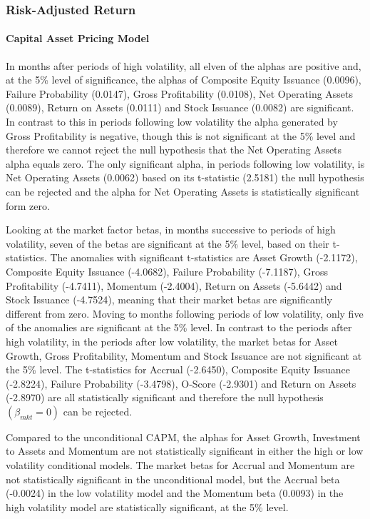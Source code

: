 \documentclass[a4paper]{article}                 %
\begin{document}
\subsubsection{Risk-Adjusted Return}
\paragraph{Capital Asset Pricing Model}
In months after periods of high volatility, all elven of the alphas are positive and, at the 5\% level of significance, the alphas of Composite Equity Issuance (0.0096), Failure Probability (0.0147), Gross Profitability (0.0108), Net Operating Assets (0.0089), Return on Assets (0.0111) and Stock Issuance (0.0082) are significant. In contrast to this in periods following low volatility the alpha generated by Gross Profitability is negative, though this is not significant at the 5\% level and therefore we cannot reject the null hypothesis that the Net Operating Assets alpha equals zero. The only significant alpha, in periods following low volatility, is Net Operating Assets (0.0062) based on its t-statistic (2.5181) the null hypothesis can be rejected and the alpha for Net Operating Assets is statistically significant form zero. 

Looking at the market factor betas, in months successive to periods of high volatility, seven of the betas are significant at the 5\% level, based on their t-statistics. The anomalies with significant t-statistics are Asset Growth (-2.1172), Composite Equity Issuance (-4.0682), Failure Probability (-7.1187), Gross Profitability (-4.7411), Momentum (-2.4004), Return on Assets (-5.6442) and Stock Issuance (-4.7524), meaning that their market betas are significantly different from zero. Moving to months following periods of low volatility, only five of the anomalies are significant at the 5\% level. In contrast to the periods after high volatility, in the periods after low volatility, the market betas for Asset Growth, Gross Profitability, Momentum and Stock Issuance are not significant at the 5\% level. The t-statistics for Accrual (-2.6450), Composite Equity Issuance (-2.8224), Failure Probability (-3.4798), O-Score (-2.9301) and Return on Assets (-2.8970) are all statistically significant and therefore the null hypothesis $(\beta_{mkt}= 0)$ can be rejected.

Compared to the unconditional CAPM, the alphas for Asset Growth, Investment to Assets and Momentum are not statistically significant in either the high or low volatility conditional models. The market betas for Accrual and Momentum are not statistically significant in the unconditional model, but the Accrual beta (-0.0024) in the low volatility model and the Momentum beta (0.0093) in the high volatility model are statistically significant, at the 5\% level. 
\end{document}
